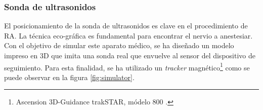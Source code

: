 

\subsubsection{Sonda de ultrasonidos}

El posicionamiento de la sonda de ultrasonidos es clave en el procedimiento de \ac{RA}. La técnica eco-gráfica es fundamental para encontrar el nervio a anestesiar. Con el objetivo de simular este aparato médico, se ha diseñado un modelo impreso en 3D que imita una sonda real que envuelve al sensor del dispositivo de seguimiento. Para esta finalidad, se ha utilizado un \emph{\acs{tracker}} magnético\footnote{Ascension 3D-Guidance trakSTAR, módelo 800 \cite{Ascension}.} como se puede observar en la figura \ref{fig:simulator}. 


